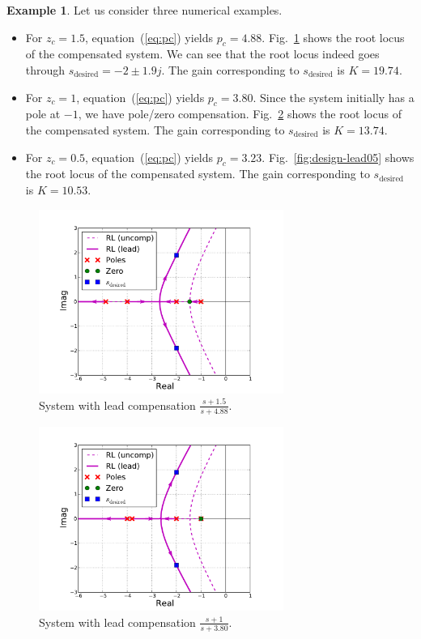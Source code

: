 \documentclass[a4paper,11pt]{report}
\theoremstyle{definition}
\newcommand{\des}{\textrm{desired}}
\newtheorem{mdexample}{Example}
\newenvironment{example}%
  {\vspace{0.1cm}\begin{mdframed}[backgroundcolor=lightgray]\begin{mdexample}}%
  {\end{mdexample}\end{mdframed}\vspace{0.1cm}}
\begin{document}
\begin{example}
  Let us consider three numerical examples.
  \begin{itemize}
  \item For $z_c=1.5$, equation~(\ref{eq:pc}) yields
    $p_c=4.88$. Fig.~\ref{fig:design-lead15} shows the root locus of
    the compensated system. We can see that the root locus indeed goes
    through $s_\des=-2\pm 1.9j$. The gain corresponding to
    $s_\des$ is $K=19.74$.
  \item For $z_c=1$, equation~(\ref{eq:pc}) yields $p_c=3.80$. Since
    the system initially has a pole at $-1$, we have pole/zero
    compensation. Fig.~\ref{fig:design-lead10} shows the root locus of
    the compensated system. The gain corresponding to $s_\des$ is
    $K=13.74$.
  \item For $z_c=0.5$, equation~(\ref{eq:pc}) yields
    $p_c=3.23$. Fig.~\ref{fig:design-lead05} shows the root locus of
    the compensated system. The gain corresponding to $s_\des$ is
    $K=10.53$.
  \end{itemize}

  \begin{figure}[H]
    \centering
    \includegraphics[width=8cm]{fig/design-lead15.pdf}
    \caption{System with lead compensation $\frac{s+1.5}{s+4.88}$.}
    \label{fig:design-lead15}
  \end{figure}
  \begin{figure}[H]
    \centering
    \includegraphics[width=8cm]{fig/design-lead10.pdf}
    \caption{System with lead compensation $\frac{s+1}{s+3.80}$.}
    \label{fig:design-lead10}
  \end{figure}


\end{example}
\end{document}
